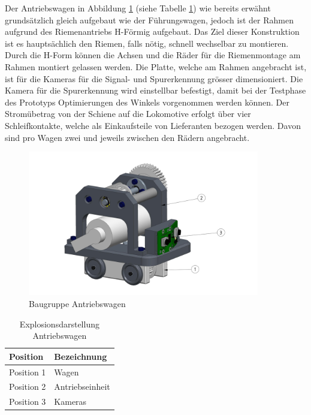 \documentclass[../../main.tex]{subfiles}
\begin{document}
    Der Antriebswagen in Abbildung \ref{fig:antriebswagen} (siehe Tabelle \ref{tab:expl_antriebswagen}) wie bereits erwähnt grundsätzlich gleich aufgebaut wie der Führungswagen, jedoch ist der Rahmen aufgrund des Riemenantriebs H-Förmig aufgebaut. Das Ziel dieser Konstruktion ist es hauptsächlich den Riemen, falls nötig, schnell wechselbar zu montieren. Durch die H-Form können die Achsen und die Räder für die Riemenmontage am Rahmen montiert gelassen werden. Die Platte, welche am Rahmen angebracht ist, ist für die Kameras für die Signal- und Spurerkennung grösser dimensioniert. Die Kamera für die Spurerkennung wird einstellbar befestigt, damit bei der Testphase des Prototyps Optimierungen des Winkels vorgenommen werden können. Der Stromübetrag von der Schiene auf die Lokomotive erfolgt über vier Schleifkontakte, welche als Einkaufsteile von Lieferanten bezogen werden. Davon sind pro Wagen zwei und jeweils zwischen den Rädern angebracht.\\

    \begin{figure}[H] %
        \centering
        \includegraphics[width=0.9\textwidth]{antriebswagen.png}
        \caption{Baugruppe Antriebswagen}
        \label{fig:antriebswagen}
    \end{figure}

    \begin{table}[H] \centering
        \begin{tabular}{|l|l|}
        \hline
        \textbf{Position} & \textbf{Bezeichnung}\\
        \hline
        Position 1          & Wagen\\
         \hline
        Position 2          & Antriebseinheit\\
        \hline
        Position 3          & Kameras\\
        \hline
    \end{tabular}

    \caption{Explosionsdarstellung Antriebswagen}
    \label{tab:expl_antriebswagen}
    \end{table}
\end{document}
